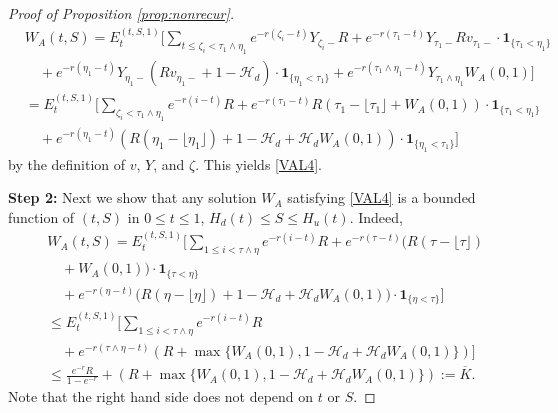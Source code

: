\documentclass[draft, noinfoline]{ectaart}
\numberwithin{equation}{section}
\theoremstyle{plain}
\begin{document}
\begin{appendices}
\begin{proof}[Proof of Proposition \ref{prop:nonrecur}]
	\begin{align*}
	&W_A(t,S)=E_t^{(t,S,1)}\Bigg[\sum_{t\le\zeta_i<\tau_1\land\eta_1}e^{-r(\zeta_i-t)}Y_{\zeta_i-}R+e^{-r(\tau_1-t)}Y_{\tau_1-}Rv_{\tau_1-}\cdot\mathbf{1}_{\{\tau_1<\eta_1\}}\\
	&\quad+e^{-r(\eta_1-t)}Y_{\eta_1-}(Rv_{\eta_1-}+1-\mathcal{H}_d)\cdot\mathbf{1}_{\{\eta_1<\tau_1\}}+e^{-r(\tau_1\land\eta_1-t)}Y_{\tau_1\land\eta_1}W_A(0,1)\Bigg]\\
	&=E_t^{(t,S,1)}\Bigg[\sum_{\zeta_i<\tau_1\land\eta_1}e^{-r(i-t)}R+e^{-r(\tau_1-t)}R(\tau_1-\lfloor\tau_1\rfloor+W_A(0,1))\cdot\mathbf{1}_{\{\tau_1<\eta_1\}}\\
	&\quad+e^{-r(\eta_1-t)}(R(\eta_1-\lfloor\eta_1\rfloor)+1-\mathcal{H}_d+\mathcal{H}_d W_A(0,1))\cdot\mathbf{1}_{\{\eta_1<\tau_1\}}\Bigg]
	\end{align*}
	by the definition of $v$, $Y$, and $\zeta$. This yields \eqref{VAL4}.
	
	{\flushleft\bf Step 2:} Next we show that any solution $W_A$ satisfying \eqref{VAL4} is a bounded function of $(t,S)$ in $0\le t\le 1$, $H_d(t)\le S\le H_u(t)$. Indeed,
	\begin{align*}
	&W_A(t,S)=E_t^{(t,S,1)}\Bigg[\sum_{1\le i< \tau\land\eta}e^{-r(i-t)}R+e^{-r(\tau-t)} \Bigg( R(\tau-\lfloor\tau\rfloor)  \\
	&\quad+W_A(0,1))\cdot\mathbf{1}_{\{\tau<\eta\}} \\
	&\quad   +e^{-r(\eta-t)}(R(\eta-\lfloor\eta\rfloor)+1-\mathcal{H}_d+\mathcal{H}_d W_A(0,1) \Bigg) \cdot \mathbf{1}_{\{\eta<\tau\}}\Bigg]\\
	&\le E_t^{(t,S,1)}\Bigg[\sum_{1\le i< \tau\land\eta}e^{-r(i-t)}R   \\
	&\quad +e^{-r(\tau\land\eta-t)}(R+\max\{W_A(0,1),1-\mathcal{H}_d+\mathcal{H}_d W_A(0,1)\})\Bigg]\\
	&\le \frac{e^{-r}R}{1-e^{-r}}+(R+\max\{W_A(0,1),1-\mathcal{H}_d+\mathcal{H}_d W_A(0,1)\}):=\overline{K}.
	\end{align*}
	Note that the right hand side does not depend on $t$ or $S$.
	

\end{proof}
\end{appendices}
\end{document}
